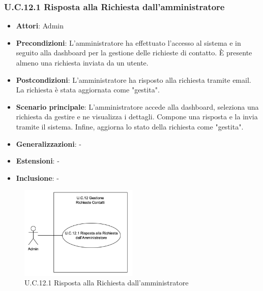 \subsubsection{U.C.12.1 Risposta alla Richiesta dall'amministratore}
\begin{itemize}
    \item \textbf{Attori}: Admin
    \item \textbf{Precondizioni}: L’amministratore ha effettuato l’accesso al sistema e in seguito alla dashboard per la gestione delle richieste di contatto. È presente almeno una richiesta inviata da un utente.
    \item \textbf{Postcondizioni}: L’amministratore ha risposto alla richiesta tramite email. La richiesta è stata aggiornata come "gestita".
    \item \textbf{Scenario principale}: L’amministratore accede alla dashboard, seleziona una richiesta da gestire e ne visualizza i dettagli. Compone una risposta e la invia tramite il sistema. Infine, aggiorna lo stato della richiesta come "gestita".
    \item \textbf{Generalizzazioni}: -
    \item \textbf{Estensioni}: -
    \item \textbf{Inclusione}: -
\end{itemize}
\begin{figure}[h!]
    \centering
    \includegraphics[width=0.5\textwidth]{img/UC12-1.png}
    \caption{U.C.12.1 Risposta alla Richiesta dall'amministratore}
\end{figure}
\newpage
